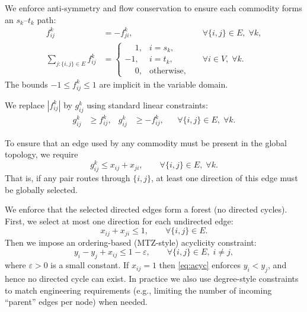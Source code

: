 We enforce anti-symmetry and flow conservation to ensure each commodity forms an $s_k$--$t_k$ path:
\begin{align}
\label{eq:antisym}
f_{ij}^k &= -f_{ji}^k, &&\forall \{i,j\}\in E,\; \forall k,\\
\label{eq:flow}
\sum_{j: \{i,j\}\in E} f_{ij}^k &=
\begin{cases}
\phantom{-}1, & i=s_k,\\
-1, & i=t_k,\\
\phantom{-}0, & \text{otherwise},
\end{cases}
&&\forall i\in V,\; \forall k.
\end{align}
The bounds $-1\le f_{ij}^k\le 1$ are implicit in the variable domain.

We replace $|f_{ij}^k|$ by $g_{ij}^k$ using standard linear constraints:
\begin{align}
\label{eq:abs}
g_{ij}^k &\ge f_{ij}^k, & g_{ij}^k &\ge -f_{ij}^k, &&\forall \{i,j\}\in E,\; \forall k.
\end{align}

To ensure that an edge used by any commodity must be present in the global topology, we require
\begin{equation}
\label{eq:couple}
g_{ij}^k \le x_{ij}+x_{ji},\qquad \forall \{i,j\}\in E,\; \forall k.
\end{equation}
That is, if any pair routes through $\{i,j\}$, at least one direction of this edge must be globally selected.

We enforce that the selected directed edges form a forest (no directed cycles).
First, we select at most one direction for each undirected edge:
\begin{equation}
\label{eq:one-dir}
x_{ij}+x_{ji}\le 1,\qquad \forall \{i,j\}\in E.
\end{equation}
Then we impose an ordering-based (MTZ-style) acyclicity constraint:
\begin{equation}
\label{eq:acyc}
y_i - y_j + x_{ij} \le 1 - \varepsilon,\qquad \forall \{i,j\}\in E,\; i\ne j,
\end{equation}
where $\varepsilon>0$ is a small constant.
If $x_{ij}=1$ then \eqref{eq:acyc} enforces $y_i<y_j$, and hence no directed cycle can exist.
In practice we also use degree-style constraints to match engineering requirements (e.g., limiting the number of incoming ``parent'' edges per node) when needed.

